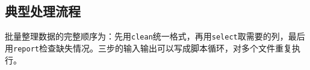 \subsection{典型处理流程}
\label{ssec:cli_pipeline}
批量整理数据的完整顺序为：先用\lstinline|clean|统一格式，再用\lstinline|select|取需要的列，最后用\lstinline|report|检查缺失情况。三步的输入输出可以写成脚本循环，对多个文件重复执行。

